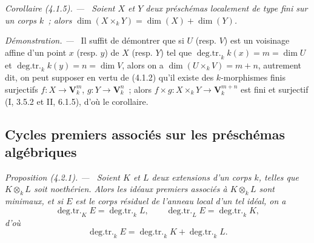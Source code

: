 \documentclass[10pt,oneside]{book}
\makeatletter
\newenvironment{proposition}[1][]{%
  \par\medskip\noindent\itshape Proposition (#1). ---\ }{\par}
\newenvironment{corollary}[1][]{%
  \par\medskip\noindent\itshape Corollaire (#1). ---\ }{\par}
\newenvironment{proof}{%
  \par\medskip\noindent\textit{Démonstration. ---\ }}{\par}
\newcommand{\EGAReaderTarget}[2]{\hypertarget{#1}{}\@bsphack\begingroup\def\@currentHref{#1}\label{#2}\endgroup\@esphack}
\makeatother
\begin{document}
\begin{corollary}[4.1.5]
\label{IV.2.4.1.5-fr}
Soient $X$ et $Y$ deux préschémas localement de type fini sur un corps $k$~;
alors $\dim(X\times_k Y)=\dim(X)+\dim(Y)$.
\end{corollary}

\begin{proof}
Il suffit de démontrer que si $U$ (resp. $V$) est un voisinage affine d'un
point $x$ (resp. $y$) de $X$ (resp. $Y$) tel que
$\operatorname{deg.tr.}_k k(x)=m=\dim U$ et
$\operatorname{deg.tr.}_k k(y)=n=\dim V$, alors on a
$\dim(U\times_k V)=m+n$, autrement dit, on peut supposer en vertu de (4.1.2)
qu'il existe des $k$-morphismes finis surjectifs
$f:X\to\mathbf V_k^m$, $g:Y\to\mathbf V_k^n$~; alors
$f\times g:X\times_k Y\to\mathbf V_k^{m+n}$ est fini et surjectif
(I, 3.5.2 et II, 6.1.5), d'où le corollaire.
\end{proof}

\subsection{Cycles premiers associés sur les préschémas algébriques}
\label{subsection:IV.2.4.2-fr}

\begin{proposition}[4.2.1]
\EGAReaderTarget{ega4.c04.prop.4-2-1}{IV.2.4.2.1-fr}
Soient $K$ et $L$ deux extensions d'un corps $k$, telles que $K\otimes_k L$
soit noethérien. Alors les idéaux premiers associés à $K\otimes_k L$ sont
minimaux, et si $E$ est le corps résiduel de l'anneau local d'un tel idéal, on
a
\begin{equation}
\tag{4.2.1.1}
\label{IV.2.4.2.1.1-fr}
\operatorname{deg.tr.}_K E=\operatorname{deg.tr.}_k L,
\qquad
\operatorname{deg.tr.}_L E=\operatorname{deg.tr.}_k K,
\end{equation}
d'où
\begin{equation}
\tag{4.2.1.2}
\label{IV.2.4.2.1.2-fr}
\operatorname{deg.tr.}_k E
=\operatorname{deg.tr.}_k K+\operatorname{deg.tr.}_k L.
\end{equation}
\end{proposition}
\end{document}
